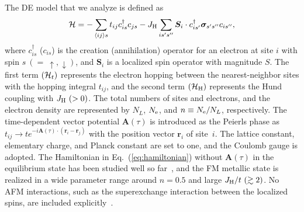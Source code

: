 \documentclass[aps,twocolumn,showpacs,prl,amsmath,amssymb]{revtex4-1}
\begin{document}
The DE model that we analyze is defined as 
\begin{align}
{\cal H}=- \sum_{\langle ij \rangle s} t_{ij} c_{i s}^\dagger c_{j s}
-J_{\rm H} \sum_{i s' s''} \bm{S}_i \cdot c_{i s'}^\dagger \bm{\sigma}_{s's''} c_{i s''} , 
\label{eq:hamiltonian}
\end{align}
where $c_{i s}^\dagger$ ($c_{i s}$) is the creation (annihilation) operator 
for an electron at site $i$ with spin $s \ (=\ \uparrow, \downarrow)$, 
and $\bm{S}_i$ is a localized spin operator with magnitude $S$. 
The first term $({\cal H}_{t})$ represents the electron hopping between the nearest-neighbor sites with the hopping integral $t_{i j}$, and the second term $({\cal H}_{\rm H})$ represents the Hund coupling with $J_{\rm H} \ (>0)$. 
The total numbers of sites and electrons, and the electron density are represented by $N_L$, $N_{\rm e}$, and $n \equiv N_{\rm e}/N_L$, respectively. 
The time-dependent vector potential $\bm{A}(\tau)$ is introduced as the Peierls phase as $t_{ij} \rightarrow t e^{-i \bm{A}(\tau) \cdot (\bm{r}_i-\bm{r}_j)}$ with the position vector $\bm{r}_i$ of site~$i$. 
The lattice constant, elementary charge, and Planck constant are set to one, and the Coulomb gauge is adopted. 
The Hamiltonian in Eq.~(\ref{eq:hamiltonian}) without $\bm{A}(\tau)$ in the equilibrium state has been studied well so far~\cite{yunoki98}, and the FM metallic state is realized in a wide parameter range around $n=0.5$ and large $J_{\rm H}/t \ (\gtrsim 2)$. 
No AFM interactions, such as the superexchange interaction between the localized spins, are included explicitly~\cite{afminteraction}. 
\end{document}
